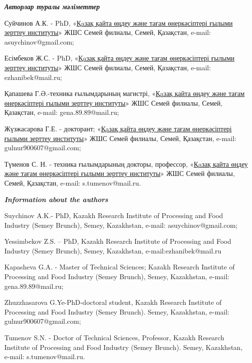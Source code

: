 \begin{authorinfo}
\emph{{\bfseries Авторлар туралы мәліметтер}}

Суйчинов А.К. - PhD, «\href{https://rpf.kz/?lang=kk}{Қaзақ қайта өңдеу
және тағам өнеркәсіптері ғылыми зерттеу институты}» ЖШС Семей филиалы,
Семей, Қазақстан, e-mail: asuychinov@gmail.com;

Есімбеков Ж.С. - PhD, «\href{https://rpf.kz/?lang=kk}{Қaзақ қайта өңдеу
және тағам өнеркәсіптері ғылыми зерттеу институты}» ЖШС Семей филиалы,
Семей, Қазақстан, e-mail: ezhanibek@mail.ru;

Қапашева Г.Ә.-техника ғылымдарының магистрі,
«\href{https://rpf.kz/?lang=kk}{Қaзақ қайта өңдеу және тағам
өнеркәсіптері ғылыми зерттеу институты}» ЖШС Семей филиалы, Семей,
Қазақстан, e-mail: gena.89.89@mail.ru;

Жүзжасарова Г.Е. - докторант; «\href{https://rpf.kz/?lang=kk}{Қaзақ
қайта өңдеу және тағам өнеркәсіптері ғылыми зерттеу институты}» ЖШС
Семей филиалы, Семей, Қазақстан, e-mail: gulnur900607@gmail.com;

Түменов С. Н. - техника ғылымдарының докторы, профессор,
«\href{https://rpf.kz/?lang=kk}{Қaзақ қайта өңдеу және тағам
өнеркәсіптері ғылыми зерттеу институты}» ЖШС Семей филиалы, Семей,
Қазақстан, e-mail: s.tumenov@mail.ru.

\emph{{\bfseries Information about the authors}}

Suychinov A.K.- PhD, Kazakh Research Institute of Processing and Food
Industry (Semey Brunch), Semey, Kazakhstan, e-mail: asuychinov@gmail.com;

Yessimbekov Z.S. -- PhD, Kazakh Research Institute of Processing and
Food Industry (Semey Brunch), Semey, Kazakhstan, e-mail:ezhanibek@mail.ru

Kapasheva G.A. - Master of Technical Sciences; Kazakh Research Institute
of Processing and Food Industry (Semey Brunch), Semey, Kazakhstan,
e-mail: gena.89.89@mail.ru;

Zhuzzhasarova G.Ye-PhD-doctoral student, Kazakh Research Institute of
Processing and Food Industry (Semey Brunch). Semey, Kazakhstan, e-mail:
gulnur900607@gmail.com;

Tumenov S.N. - Doctor of Technical Sciences, Professor, Kazakh Research
Institute of Processing and Food Industry (Semey Brunch). Semey,
Kazakhstan, e-mail: s.tumenov@mail.ru.
\end{authorinfo}
